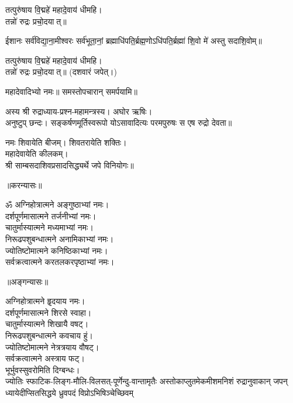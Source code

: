 तत्पुरु॑षाय वि॒द्महे॑ महादे॒वाय॑ धीमहि।\\
तन्नो॑ रुद्रः प्रचो॒दयात्॥

ईशानः सर्व॑विद्या॒ना॒मीश्वरः सर्व॑भूता॒नां॒ ब्रह्माधि॑पति॒र्ब्रह्म॒णो\-ऽधि॑पति॒र्ब्रह्मा॑ शि॒वो मे॑ अस्तु सदाशि॒वोम्॥

तत्पुरु॑षाय वि॒द्महे॑ महादे॒वाय॑ धीमहि।\\
तन्नो॑ रुद्रः प्रचो॒दयात्॥ (दशवारं जपेत्।)

महादेवादिभ्यो नमः॥ समस्तोपचारान् समर्पयामि॥

{\small \closesection}


{\small \closesection}


अस्य श्री रुद्राध्याय-प्रश्न-महामन्त्रस्य। अघोर ऋषिः।\\
अनुष्टुप् छन्दः। सङ्कर्षणमूर्तिस्वरूपो योऽसावादित्यः परमपुरुषः स एष रुद्रो देवता॥

नमः शिवायेति बीजम्। शिवतरायेति शक्तिः।\\
महादेवायेति कीलकम्।\\
श्री साम्बसदाशिवप्रसादसिद्ध्यर्थे जपे विनियोगः॥\\


\centerline{॥करन्यासः॥}
ॐ अग्निहोत्रात्मने अङ्गुष्ठाभ्यां नमः।\\
दर्शपूर्णमासात्मने तर्जनीभ्यां नमः।\\
चातुर्मास्यात्मने मध्यमाभ्यां नमः।\\
निरूढपशुबन्धात्मने अनामिकाभ्यां नमः।\\
ज्योतिष्टोमात्मने कनिष्ठिकाभ्यां नमः।\\
सर्वक्रत्वात्मने करतलकरपृष्ठाभ्यां  नमः।\\


\centerline{॥अङ्गन्यासः॥}
अग्निहोत्रात्मने हॄदयाय नमः।\\
दर्शपूर्णमासात्मने शिरसे स्वाहा।\\
चातुर्मास्यात्मने शिखायै वषट्।\\
निरूढपशुबन्धात्मने कवचाय हुं।\\
ज्योतिष्टोमात्मने नेत्रत्रयाय वौषट्।\\
सर्वक्रत्वात्मने अस्त्राय फट्।\\
भूर्भुवस्सुवरोमिति दिग्बन्धः।\\

\setlength{\shlokaspaceskip}{2pt}
{ज्योतिः स्फाटिक-लिङ्ग-मौलि-विलसत्-पूर्णेन्दु-वान्तामृतैः}
{अस्तोकाप्लुतमेकमीशमनिशं रुद्रानुवाकान् जपन्}
{ध्यायेदीप्सितसिद्धये ध्रुवपदं विप्रोऽभिषिञ्चेच्छिवम्}

